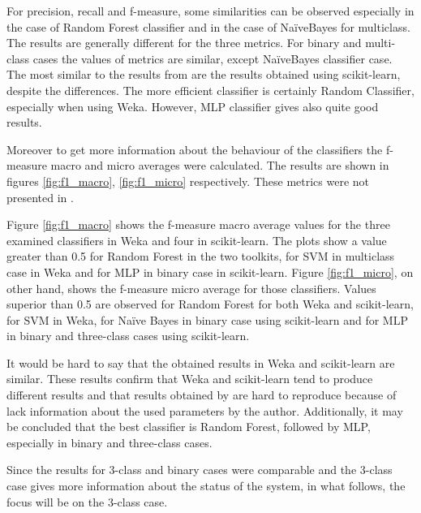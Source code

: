 For precision, recall and f-measure, some similarities can be observed especially in the case of Random Forest classifier and in the case of NaïveBayes for multiclass. The results are generally different for the three metrics. For binary and multi-class cases the values of metrics are similar, except NaïveBayes classifier case. The most similar to the results from \cite{borges_hink_machine_2014-1} are the results obtained using scikit-learn, despite the differences. The more efficient classifier is certainly Random Classifier, especially when using Weka. However, MLP classifier gives also quite good results.

Moreover to get more information about the behaviour of the classifiers the f-measure macro and micro averages were calculated. The results are shown in figures \ref{fig:f1_macro}, \ref{fig:f1_micro} respectively. These metrics were not presented in \cite{borges_hink_machine_2014-1}.

Figure \ref{fig:f1_macro} shows the f-measure macro average values for the three examined classifiers in Weka and four in scikit-learn. The plots show a value greater than 0.5 for Random Forest in the two toolkits, for SVM in multiclass case in Weka and for MLP in binary case in scikit-learn. Figure \ref{fig:f1_micro}, on other hand, shows the f-measure micro average for those classifiers. Values superior than 0.5 are observed for Random Forest for both Weka and scikit-learn, for SVM in Weka, for Naïve Bayes in binary case using scikit-learn and for MLP in binary and three-class cases using scikit-learn.

It would be hard to say that the obtained results in Weka and scikit-learn are similar. These results confirm that Weka and scikit-learn tend to produce different results and that  results obtained by \cite{borges_hink_machine_2014-1} are hard to reproduce because of lack information about the used parameters by the author. Additionally, it may be concluded that the best classifier is Random Forest, followed by MLP, especially in binary and three-class cases. 

Since the results for 3-class and binary cases were comparable and the 3-class case gives more information about the status of the system, in what follows, the focus will be on the 3-class case.

